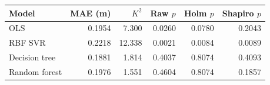 \begin{tabular}{lrrrrr}
\toprule
Model & MAE (m) & $K^2$ & Raw $p$ & Holm $p$ & Shapiro $p$ \\
\midrule
OLS & 0.1954 & 7.300 & 0.0260 & 0.0780 & 0.2043 \\
RBF SVR & 0.2218 & 12.338 & 0.0021 & 0.0084 & 0.0089 \\
Decision tree & 0.1881 & 1.814 & 0.4037 & 0.8074 & 0.4093 \\
Random forest & 0.1976 & 1.551 & 0.4604 & 0.8074 & 0.1857 \\
\bottomrule
\end{tabular}
